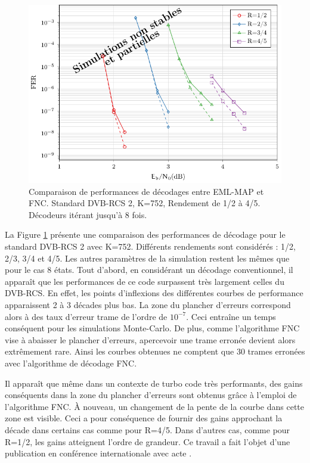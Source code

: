 \begin{figure}[!htb]
	\centering
	\includegraphics[width=\textwidth]{main/ch3_fig/fnc/dvb2/tikz/dvb2.pdf}
	\caption{Comparaison de performances de décodages entre EML-MAP et FNC. Standard DVB-RCS 2, K=752, Rendement de 1/2 à 
	4/5. Décodeurs itérant jusqu'à 8 fois. \label{fig:fnc_dvb2_752}}
\end{figure}

La Figure \ref{fig:fnc_dvb2_752} présente une comparaison des performances de décodage pour le standard DVB-RCS 2 avec
K=752. Différents rendements sont considérés : 1/2, 2/3, 3/4 et 4/5. Les autres paramètres de la simulation restent les
mêmes que pour le cas 8 états.
Tout d'abord, en considérant un décodage conventionnel, il apparaît que les performances de ce code surpassent très largement 
celles du DVB-RCS. En effet, les points d'inflexions des différentes courbes de performance apparaissent 2 à 3 décades
plus bas. La zone du plancher d'erreurs correspond alors à des taux d'erreur trame de l'ordre de $10^{-7}$. Ceci entraîne
un temps conséquent pour les simulations Monte-Carlo. De plus, comme l'algorithme FNC vise à abaisser le plancher 
d'erreurs, apercevoir une trame erronée devient alors extrêmement rare. Ainsi les courbes obtenues ne comptent que 30 
trames erronées avec l'algorithme de décodage FNC.

Il apparaît que même dans un contexte de turbo code très performants, des gains conséquents dans la zone du plancher d'erreurs 
sont obtenus grâce à l'emploi de l'algorithme FNC. À nouveau, un changement de la pente de la courbe dans cette zone est
visible. Ceci a pour conséquence de fournir des gains approchant la décade dans certains cas comme pour R=4/5. Dans d'autres
cas, comme pour R=1/2, les gains atteignent l'ordre de grandeur. Ce travail a fait l'objet d'une publication en
conférence internationale avec acte .

